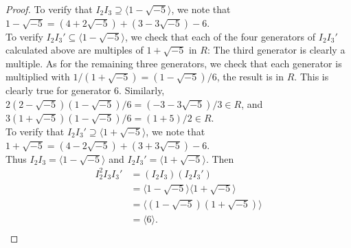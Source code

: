 \documentclass{article}
\begin{document}
\begin{enumerate}[label={\bf(\alph*)}]
\begin{proof}
        To verify that $I_2I_3\supseteq\langle1-\sqrt{-5}\rangle$, we note
        that $1-\sqrt{-5}=(4+2\sqrt{-5})+(3-3\sqrt{-5})-6$. \\

        To verify $I_2I_3'\subseteq\langle1-\sqrt{-5}\rangle$, we check that
        each of the four generators of $I_2I_3'$ calculated above are
        multiples of $1+\sqrt{-5}$ in $R$: The third generator is clearly a
        multiple. As for the remaining three generators, we check that each
        generator is multiplied with $1/(1+\sqrt{-5})=(1-\sqrt{-5})/6$, the
        result is in $R$. This is clearly true for generator 6. Similarly,
        $2(2-\sqrt{-5})(1-\sqrt{-5})/6=(-3-3\sqrt{-5})/3\in R$, and
        $3(1+\sqrt{-5})(1-\sqrt{-5})/6=(1+5)/2\in R$. \\

        To verify that $I_2I_3'\supseteq\langle1+\sqrt{-5}\rangle$, we note
        that $1+\sqrt{-5}=(4-2\sqrt{-5})+(3+3\sqrt{-5})-6$. \\

        Thus $I_2I_3=\langle1-\sqrt{-5}\rangle$ and
        $I_2I_3'=\langle1+\sqrt{-5}\rangle$. Then
        \begin{align*}
          I_2^2I_3I_3' &=(I_2I_3)(I_2I_3') \\
            &=\langle1-\sqrt{-5}\rangle \langle1+\sqrt{-5}\rangle \\
            &=\langle(1-\sqrt{-5})(1+\sqrt{-5})\rangle \\
            &=\langle6\rangle. \\
        \end{align*}
      \end{proof}
  \end{enumerate}
\end{document}
